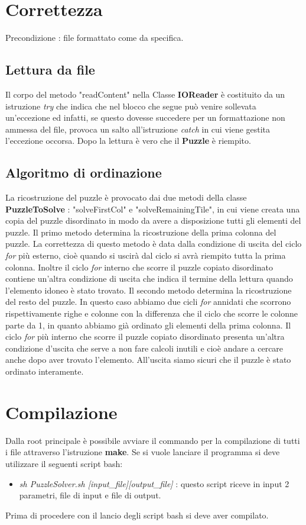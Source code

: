 \documentclass[11pt]{article}
\begin{document}
\newpage
\section{Correttezza}
Precondizione : file formattato come da specifica.
\subsection{Lettura da file}
Il corpo del metodo "readContent" nella Classe \textbf{IOReader} è costituito da un istruzione \textit{try} che indica che nel blocco che segue può venire sollevata un'eccezione ed infatti, se questo dovesse succedere per un formattazione non ammessa del file, provoca un salto all'istruzione \textit{catch} in cui viene gestita l'eccezione occorsa. Dopo la lettura è vero che il \textbf{Puzzle} è riempito.
\subsection{Algoritmo di ordinazione}
La ricostruzione del puzzle è provocato dai due metodi della classe \textbf{PuzzleToSolve} : "solveFirstCol" e "solveRemainingTile", in cui viene creata una copia del puzzle disordinato in modo da avere a disposizione tutti gli elementi del puzzle.
Il primo metodo determina la ricostruzione della prima colonna del puzzle. La correttezza di questo metodo è data dalla condizione di uscita del ciclo \textit{for} più esterno, cioè quando si uscirà dal ciclo si avrà riempito tutta la prima colonna. Inoltre il ciclo \textit{for} interno che scorre il puzzle copiato disordinato contiene un'altra condizione di uscita che indica il termine della lettura quando l'elemento idoneo è stato trovato.
Il secondo metodo determina la ricostruzione del resto del puzzle. In questo caso abbiamo due cicli \textit{for}  annidati che scorrono rispettivamente righe e colonne con la differenza che il ciclo che scorre le colonne parte da 1, in quanto abbiamo già ordinato gli elementi della prima colonna. Il ciclo \textit{for} più interno che scorre il puzzle copiato disordinato presenta un'altra condizione d'uscita che serve a non fare calcoli inutili e cioè andare a cercare anche dopo aver trovato l'elemento.
All'uscita siamo sicuri che il puzzle è stato ordinato interamente.

\section{Compilazione}
Dalla root principale è possibile avviare il commando per la compilazione di tutti i file attraverso l'istruzione \textbf{make}. Se si vuole lanciare il programma si deve utilizzare il seguenti script bash:
\begin{itemize}
	\item \textit{sh PuzzleSolver.sh [input\_file][output\_file]} : questo script riceve in input 2 parametri, file di input e file di output.
\end{itemize}
Prima di procedere con il lancio degli script bash si deve aver compilato.
\end{document}
